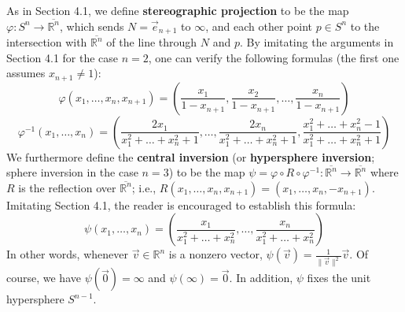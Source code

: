 \documentclass[leqno]{book}
\begin{document}
As in Section 4.1, we define \textbf{stereographic projection} to be the map $\varphi:S^n\to\overline{\mathbb R^n}$, which sends $N=\vec e_{n+1}$ to $\infty$, and each other point $p\in S^n$ to the intersection with $\overline{\mathbb R^n}$ of the line through $N$ and $p$.  By imitating the arguments in Section 4.1 for the case $n=2$, one can verify the following formulas (the first one assumes $x_{n+1}\ne 1$):
\begin{equation}\tag{F1}
\varphi(x_1,\dots,x_n,x_{n+1})=\left(\frac{x_1}{1-x_{n+1}},\frac{x_2}{1-x_{n+1}},\dots,\frac{x_n}{1-x_{n+1}}\right)
\end{equation}
\begin{equation}\tag{F2}
\varphi^{-1}(x_1,\dots,x_n)=\left(\frac{2x_1}{x_1^2+\dots+x_n^2+1},\dots,\frac{2x_n}{x_1^2+\dots+x_n^2+1},\frac{x_1^2+\dots+x_n^2-1}{x_1^2+\dots+x_n^2+1}\right)
\end{equation}
We furthermore define the \textbf{central inversion} (or \textbf{hypersphere inversion}; sphere inversion in the case $n=3$) to be the map $\psi=\varphi\circ R\circ\varphi^{-1}:\overline{\mathbb R^n}\to\overline{\mathbb R^n}$ where $R$ is the reflection over $\overline{\mathbb R^n}$; i.e., $R(x_1,\dots,x_n,x_{n+1})=(x_1,\dots,x_n,-x_{n+1})$.  Imitating Section 4.1, the reader is encouraged to establish this formula:
$$\psi(x_1,\dots,x_n)=\left(\frac{x_1}{x_1^2+\dots+x_n^2},\dots,\frac{x_n}{x_1^2+\dots+x_n^2}\right)$$
In other words, whenever $\vec v\in\mathbb R^n$ is a nonzero vector, $\psi(\vec v)=\frac 1{\|\vec v\|^2}\vec v$.  Of course, we have $\psi(\vec 0)=\infty$ and $\psi(\infty)=\vec 0$.  In addition, $\psi$ fixes the unit hypersphere $S^{n-1}$.
\end{document}
